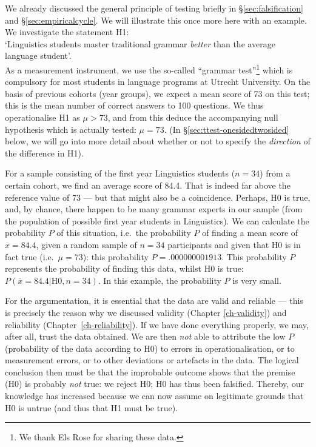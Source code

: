\documentclass[
]{book}
\begin{document}
We already discussed the general principle of testing briefly in
§\ref{sec:falsification} and §\ref{sec:empiricalcycle}.
We will illustrate this once more here
with an example. We investigate the statement H1:\\
`Linguistics students master traditional grammar \emph{better} than the average language student'.\\
As a measurement instrument, we use the so-called ``grammar test''\footnote{We thank Els Rose for sharing these data.} which is compulsory
for most students
in language programs at Utrecht University. On the basis of previous cohorts (year groups),
we expect a mean score of 73 on this test;
this is the mean number of correct answers to 100 questions.
We thus operationalise H1 as \(\mu > 73\), and from this deduce
the accompanying null hypothesis which is actually tested:
\(\mu = 73\).
(In §\ref{sec:ttest-onesidedtwosided} below, we will go into more detail
about whether or not to specify the \emph{direction} of the difference in H1).

For a sample consisting of the first year Linguistics students (\(n=34\)) from a certain cohort,
we find an average score of 84.4. That is indeed far above the reference value
of 73 --- but that might also be a coincidence.
Perhaps, H0 is true, and, by chance, there happen to be many grammar experts
in our sample (from the population of possible first year students
in Linguistics). We can calculate the probability \(P\) of this situation,
i.e.~the probability \(P\) of finding a mean score of \(\overline{x}=84.4\),
given a random sample of \(n=34\) participants and given that
H0 is in fact true (i.e.~\(\mu=73\)): this probability
\(P=.000000001913\).
This probability \(P\) represents the probability of finding this
data, whilst H0 is true:
\(P(\overline{x}=84.4|\textrm{H0}, n=34)\).
In this example, the probability \(P\) is very small.

For the argumentation, it is essential that the data are valid and
reliable --- this is precisely the reason why we discussed validity
(Chapter \ref{ch-validity}) and reliability
(Chapter~\ref{ch-reliability}). If we have done everything properly,
we may, after all, trust the data obtained.
We are then \emph{not} able to attribute the low \(P\) (probability of the data according to H0) to errors in operationalisation, or to measurement errors, or to other deviations or artefacts in the data.
The logical conclusion then must be that the improbable outcome shows that the
premise (H0) is probably \emph{not} true: we reject H0; H0 has thus been
falsified. Thereby, our knowledge has increased because we can now
assume on legitimate grounds that H0 is untrue (and thus that H1
must be true).
\end{document}
